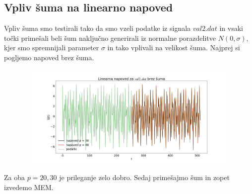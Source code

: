 \documentclass[11pt, a4paper]{article}
\begin{document}
\subsection{Vpliv šuma na linearno napoved}
Vpliv šuma smo testirali tako da smo vzeli podatke iz signala $val2.dat$ in vsaki točki primešali beli šum naključno generirali iz normalne porazdelitve $N(0, \sigma)$, kjer smo spremnijali parameter $\sigma $ in tako vplivali na velikost šuma. Najprej si pogljemo napoved brez šuma. 
\begin{figure}[H]
\centering
  \includegraphics[width=16cm,height=5cm]{zadnja0.png}
 

\end{figure}
Za oba $p = 20,30$ je prileganje zelo dobro. Sedaj primešajmo šum in zopet izvedemo MEM.
\end{document}
